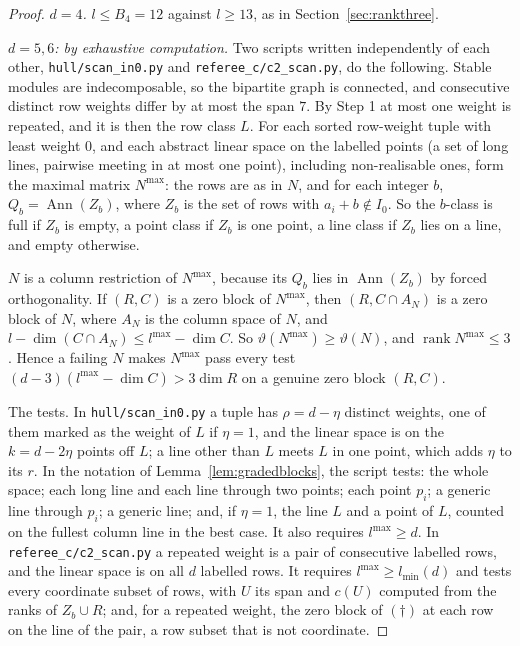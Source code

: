 \documentclass[11pt,a4paper]{article}
\theoremstyle{plain}
\theoremstyle{definition}
\newcommand{\rk}{\operatorname{rank}}
\newcommand{\vth}{\vartheta}
\newcommand{\Ann}{\operatorname{Ann}}
\newcommand{\Iz}{I_{0}}
\newcommand{\scr}[1]{\nolinkurl{#1}}
\begin{document}
\begin{proof}
\emph{$d=4$.} $l\le B_{4}=12$ against $l\ge13$, as in Section~\ref{sec:rankthree}.

\emph{$d=5,6$: by exhaustive computation.} Two scripts written independently of each other, \scr{hull/scan_in0.py} and \scr{referee_c/c2_scan.py}, do the following. Stable modules are indecomposable, so the bipartite graph is connected, and consecutive distinct row weights differ by at most the span $7$. By Step 1 at most one weight is repeated, and it is then the row class $L$. For each sorted row-weight tuple with least weight $0$, and each abstract linear space on the labelled points (a set of long lines, pairwise meeting in at most one point), including non-realisable ones, form the maximal matrix $N^{\max}$: the rows are as in $N$, and for each integer $b$, $Q_{b}=\Ann(Z_{b})$, where $Z_{b}$ is the set of rows with $a_{i}+b\notin\Iz$. So the $b$-class is full if $Z_{b}$ is empty, a point class if $Z_{b}$ is one point, a line class if $Z_{b}$ lies on a line, and empty otherwise.

$N$ is a column restriction of $N^{\max}$, because its $Q_{b}$ lies in $\Ann(Z_{b})$ by forced orthogonality. If $(R,C)$ is a zero block of $N^{\max}$, then $(R,C\cap A_{N})$ is a zero block of $N$, where $A_{N}$ is the column space of $N$, and $l-\dim(C\cap A_{N})\le l^{\max}-\dim C$. So $\vth(N^{\max})\ge\vth(N)$, and $\rk N^{\max}\le3$. Hence a failing $N$ makes $N^{\max}$ pass every test $(d-3)(l^{\max}-\dim C)>3\dim R$ on a genuine zero block $(R,C)$.

The tests. In \scr{hull/scan_in0.py} a tuple has $\rho=d-\eta$ distinct weights, one of them marked as the weight of $L$ if $\eta=1$, and the linear space is on the $k=d-2\eta$ points off $L$; a line other than $L$ meets $L$ in one point, which adds $\eta$ to its $r$. In the notation of Lemma~\ref{lem:gradedblocks}, the script tests: the whole space; each long line and each line through two points; each point $p_{i}$; a generic line through $p_{i}$; a generic line; and, if $\eta=1$, the line $L$ and a point of $L$, counted on the fullest column line in the best case. It also requires $l^{\max}\ge d$. In \scr{referee_c/c2_scan.py} a repeated weight is a pair of consecutive labelled rows, and the linear space is on all $d$ labelled rows. It requires $l^{\max}\ge l_{\min}(d)$ and tests every coordinate subset of rows, with $U$ its span and $c(U)$ computed from the ranks of $Z_{b}\cup R$; and, for a repeated weight, the zero block of $(\dagger)$ at each row on the line of the pair, a row subset that is not coordinate.


\end{proof}
\end{document}
